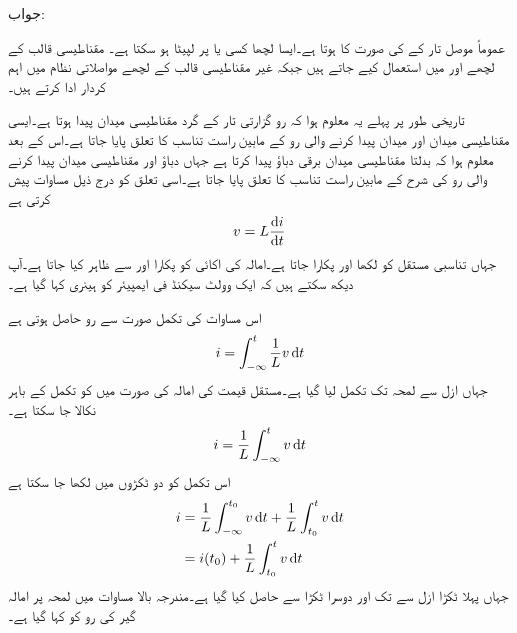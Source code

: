 جواب:

 عموماً موصل تار کے  کی صورت کا ہوتا ہے۔ایسا لچھا کسی  یا  پر لپیٹا ہو سکتا ہے۔ مقناطیسی قالب کے لچھے  اور  میں استعمال کیے جاتے ہیں جبکہ غیر مقناطیسی قالب کے لچھے مواصلاتی نظام میں اہم کردار ادا کرتے ہیں۔

تاریخی طور پر پہلے یہ معلوم ہوا کہ رو گزارتی تار کے گرد مقناطیسی میدان پیدا ہوتا ہے۔ایسی مقناطیسی میدان اور میدان پیدا کرنے والی رو کے مابین راست تناسب   کا تعلق پایا جاتا ہے۔اس کے بعد معلوم ہوا کہ بدلتا مقناطیسی میدان برقی دباؤ پیدا کرتا ہے جہاں دباؤ اور مقناطیسی میدان پیدا کرنے والی رو کی شرح کے مابین راست تناسب کا  تعلق پایا جاتا ہے۔اسی تعلق کو درج ذیل مساوات پیش کرتی ہے
\begin{align}\label{مساوات_امالہ_بنیادی_مساوات_امالہ_الف}
v=L \frac{\dif i}{\dif t}
\end{align}
جہاں تناسبی مستقل کو  لکھا اور  پکارا جاتا ہے۔امالہ کی اکائی کو  پکارا اور  سے ظاہر کیا جاتا ہے۔آپ دیکھ سکتے ہیں کہ ایک وولٹ سیکنڈ فی ایمپیئر  کو ہینری کہا گیا ہے۔ 

اس مساوات کی تکمل صورت سے رو حاصل ہوتی ہے
\begin{align}
i=\int_{-\infty}^{t}\frac{1}{L} v \dif t
\end{align}
جہاں ازل  سے لمحہ  تک تکمل لیا گیا ہے۔مستقل قیمت کی امالہ کی صورت میں  کو تکمل کے باہر نکالا جا سکتا ہے۔
\begin{align}
i=\frac{1}{L}\int_{-\infty}^{t} v \dif t
\end{align}
اس تکمل کو دو ٹکڑوں میں لکھا جا سکتا ہے 
\begin{gather}
\begin{aligned}
i&=\frac{1}{L}\int_{-\infty}^{t_0} v \dif t+\frac{1}{L} \int_{t_0}^{t} v \dif t\\
&=i(t_0)+\frac{1}{L} \int_{t_0}^{t} v \dif t
\end{aligned}
\end{gather}
جہاں پہلا ٹکڑا ازل سے  تک اور دوسرا ٹکڑا  سے  حاصل کیا گیا ہے۔مندرجہ بالا مساوات میں لمحہ  پر امالہ گیر کی رو کو  کہا گیا ہے۔

